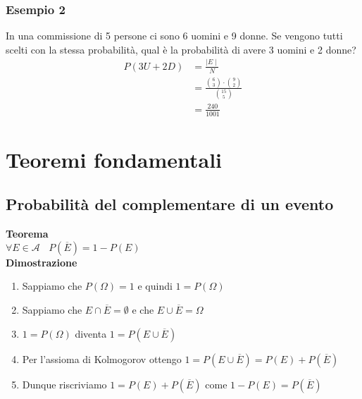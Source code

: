 \documentclass[11pt]{report}
\begin{document}
\subsubsection{Esempio 2}
In una commissione di 5 persone ci sono 6 uomini e 9 donne. Se vengono tutti scelti con la stessa probabilità, qual è la probabilità di avere 3 uomini e 2 donne?
\begin{equation}
    \begin{split}
        P(3U + 2D) & = \frac{\mid E \mid}{N}\\
        & = \frac{\binom{6}{3} \cdot \binom{9}{2}}{\binom{15}{5}}\\
        & = \frac{240}{1001}
    \end{split}
\end{equation}

\section{Teoremi fondamentali}
\subsection{Probabilità del complementare di un evento}
\textbf{Teorema}\\
$\forall E \in \mathcal{A}\ \ \ \ P(\overline{E}) = 1 - P(E)$\\
\textbf{Dimostrazione}
\begin{enumerate}
	\item Sappiamo che $P(\Omega) = 1$ e quindi $1 = P(\Omega)$
	\item Sappiamo che $E \cap \overline{E} = \emptyset$ e che $E \cup \overline{E} = \Omega$
	\item $1 = P(\Omega)$ diventa $1 = P(E \cup \overline{E})$
	\item Per l'assioma di Kolmogorov ottengo $1 = P(E \cup \overline{E}) = P(E) + P(\overline{E})$
	\item Dunque riscriviamo $1 = P(E) + P(\overline{E})$ come $1 - P(E) = P(\overline{E})$
\end{enumerate}
\end{document}
